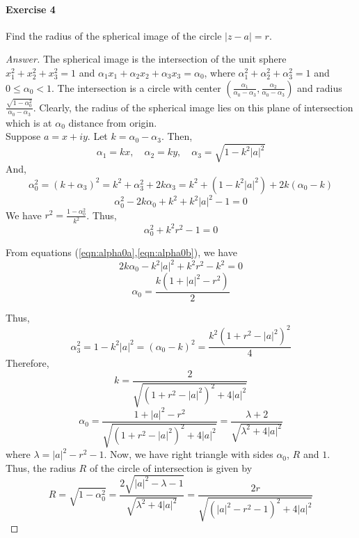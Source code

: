 \paragraph{Exercise 4} Find the radius of the spherical image of the circle $|z-a|=r$.
	\begin{proof}[Answer]
		The spherical image is the intersection of the unit sphere $x_1^2+x_2^2+x_3^2=1$ and $\alpha_1x_1 + \alpha_2x_2 + \alpha_3x_3 = \alpha_0$, where $\alpha_1^2+\alpha_2^2+\alpha_3^2 =1$ and $0 \le \alpha_0 < 1$.
		The intersection is a circle with center $\left(\frac{\alpha_1}{\alpha_0-\alpha_3},\frac{\alpha_2}{\alpha_0-\alpha_3}\right)$ and radius $\frac{\sqrt{1-\alpha_0^2}}{\alpha_0-\alpha_3}$.
		Clearly, the radius of the spherical image lies on this plane of intersection which is at $\alpha_0$ distance from origin.\\

		Suppose $a = x+iy$.
		Let $k = \alpha_0 - \alpha_3$.
		Then,
		\[ \alpha_1 = kx,\quad \alpha_2 = ky,\quad \alpha_3 = \sqrt{1-k^2|a|^2} \]
		And,
		\[ \alpha_0^2 = (k+\alpha_3)^2 = k^2+\alpha_3^2+2k\alpha_3 = k^2+(1-k^2|a|^2)+2k(\alpha_0-k) \]
		\begin{equation}
			\alpha_0^2-2k\alpha_0+k^2+k^2|a|^2-1 = 0 
			\label{eqn:alpha0a}
		\end{equation}
		We have $r^2 = \frac{1-\alpha_0^2}{k^2}$.
		Thus,
		\begin{equation}
			\alpha_0^2 + k^2r^2 - 1 = 0 
			\label{eqn:alpha0b}
		\end{equation}

		From equations (\ref{eqn:alpha0a},\ref{eqn:alpha0b}), we have
		\[ 2k\alpha_0-k^2|a|^2+k^2r^2-k^2 = 0 \]
		\[ \alpha_0 = \frac{k(1+|a|^2-r^2)}{2} \]

		Thus,
		\[ \alpha_3^2 = 1-k^2|a|^2 = (\alpha_0-k)^2 = \frac{k^2(1+r^2-|a|^2)^2}{4} \]
		Therefore,
		\[ k = \frac{2}{\sqrt{(1+r^2-|a|^2)^2+4|a|^2}} \]
		\[ \alpha_0 = \frac{1+|a|^2-r^2}{\sqrt{(1+r^2-|a|^2)^2+4|a|^2}} = \frac{\lambda+2}{\sqrt{\lambda^2+4|a|^2}} \]
		where $\lambda = |a|^2-r^2-1$.
		Now, we have right triangle with sides $\alpha_0$, $R$ and $1$.
		Thus, the radius $R$ of the circle of intersection is given by 
		\[ R = \sqrt{1-\alpha_0^2} = \frac{2\sqrt{|a|^2-\lambda-1}}{\sqrt{\lambda^2+4|a|^2}} = \frac{2r}{\sqrt{(|a|^2-r^2-1)^2+4|a|^2}} \]
	\end{proof}
